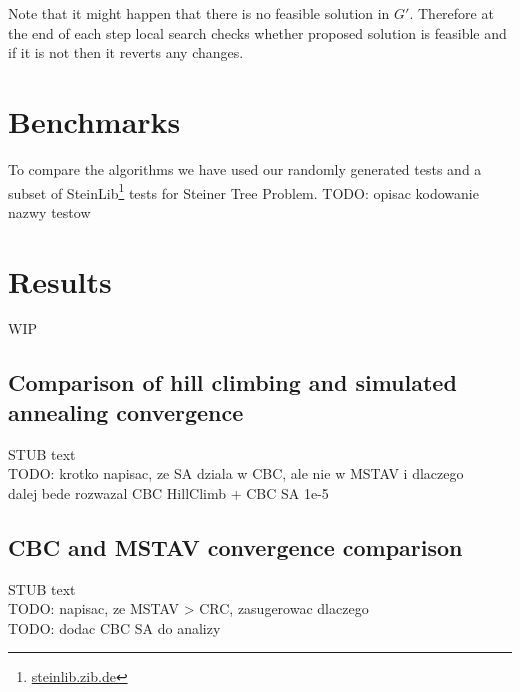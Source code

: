 Note that it might happen that there is no feasible solution in $G'$. Therefore at the end of each step local search checks whether proposed solution is feasible and if it is not then it reverts any changes.

\section{Benchmarks}
To compare the algorithms we have used our randomly generated tests and a subset of SteinLib\footnote{\url{steinlib.zib.de}} tests for Steiner Tree Problem.
TODO: opisac kodowanie nazwy testow

\section{Results}
WIP

\subsection{Comparison of hill climbing and simulated annealing convergence}
STUB text\\
TODO: krotko napisac, ze SA dziala w CBC, ale nie w MSTAV i dlaczego\\
dalej bede rozwazal CBC HillClimb + CBC SA 1e-5\\














\subsection{CBC and MSTAV convergence comparison}
STUB text\\
TODO: napisac, ze MSTAV > CRC, zasugerowac dlaczego\\
TODO: dodac CBC SA do analizy





